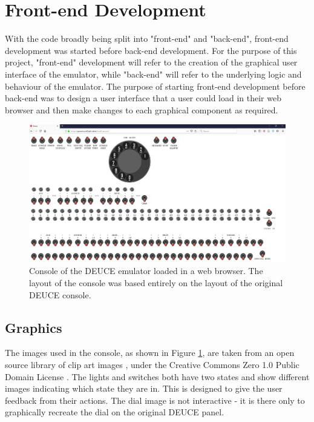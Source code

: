 \documentclass{l4proj}
\begin{document}
\section{Front-end Development}
With the code broadly being split into "front-end" and "back-end", front-end development was started before back-end development. For the purpose of this project, "front-end" development will refer to the creation of the graphical user interface of the emulator, while "back-end" will refer to the underlying logic and behaviour of the emulator. The purpose of starting front-end development before back-end was to design a user interface that a user could load in their web browser and then make changes to each graphical component as required. 

\begin{figure}[h]
	\centering
	\includegraphics[width=\linewidth]{images/deuce-emu}
	\caption{Console of the DEUCE emulator loaded in a web browser. The layout of the console was based entirely on the layout of the original DEUCE console.}
	\label{fig:deuce-emu}
\end{figure}

\subsection{Graphics}
The images used in the console, as shown in Figure \ref{fig:deuce-emu}, are taken from an open source library of clip art images \citep{openclipart}, under the Creative Commons Zero 1.0 Public Domain License \citep{creativecommons}. The lights and switches both have two states and show different images indicating which state they are in. This is designed to give the user feedback from their actions. The dial image is not interactive - it is there only to graphically recreate the dial on the original DEUCE panel.
\end{document}
